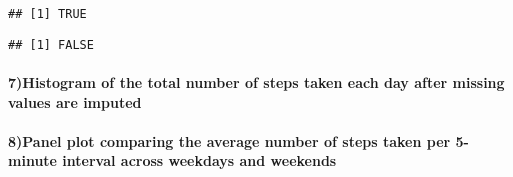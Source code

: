 \documentclass[]{article}
\newenvironment{Shaded}{\begin{snugshade}}{\end{snugshade}}
\newcommand{\KeywordTok}[1]{\textcolor[rgb]{0.13,0.29,0.53}{\textbf{#1}}}
\newcommand{\DataTypeTok}[1]{\textcolor[rgb]{0.13,0.29,0.53}{#1}}
\newcommand{\StringTok}[1]{\textcolor[rgb]{0.31,0.60,0.02}{#1}}
\newcommand{\OtherTok}[1]{\textcolor[rgb]{0.56,0.35,0.01}{#1}}
\newcommand{\OperatorTok}[1]{\textcolor[rgb]{0.81,0.36,0.00}{\textbf{#1}}}
\newcommand{\NormalTok}[1]{#1}
\let\oldparagraph\paragraph
\renewcommand{\paragraph}[1]{\oldparagraph{#1}\mbox{}}
\begin{document}
\begin{verbatim}
## [1] TRUE
\end{verbatim}

\begin{Shaded}
\end{Shaded}

\begin{verbatim}
## [1] FALSE
\end{verbatim}

\paragraph{7)Histogram of the total number of steps taken each day after
missing values are
imputed}\label{histogram-of-the-total-number-of-steps-taken-each-day-after-missing-values-are-imputed}

\begin{Shaded}
\end{Shaded}

\paragraph{8)Panel plot comparing the average number of steps taken per
5-minute interval across weekdays and
weekends}\label{panel-plot-comparing-the-average-number-of-steps-taken-per-5-minute-interval-across-weekdays-and-weekends}
\end{document}
